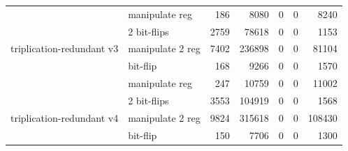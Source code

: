 \begin{table}
\begin{tabular}{llrrrrr}
                                              & manipulate reg   & 186                                               & 8080                                                   & 0 & 0                                                  & 8240                                                \\
                                              & 2 bit-flips        & 2759                                              & 78618                                                  & 0 & 0                                                  & 1153                                                \\
\multirow{-4}{*}{triplication-redundant v3} & manipulate 2 reg & 7402                                              & 236898                                                 & 0 & 0                                                  & 81104                                               \\
\hline
                                              & bit-flip          & 168                                               & 9266                                                   & 0 & 0                                                  & 1570                                                \\
                                              & manipulate reg   & 247                                               & 10759                                                  & 0 & 0                                                  & 11002                                               \\
                                              & 2 bit-flips        & 3553                                              & 104919                                                 & 0 & 0                                                  & 1568                                                \\
\multirow{-4}{*}{triplication-redundant v4} & manipulate 2 reg & 9824                                              & 315618                                                 & 0 & 0                                                  & 108430                                              \\
\hline
                                              & bit-flip          & 150                                               & 7706                                                   & 0 & 0                                                  & 1300                                                \\

\end{tabular}
\end{table}
